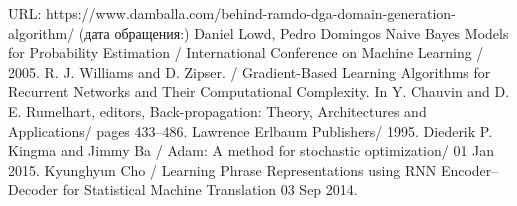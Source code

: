 \begin{thebibliography}{00}
    URL: https://www.damballa.com/behind-ramdo-dga-domain-generation-algorithm/
    (дата обращения:)
    Daniel Lowd, Pedro Domingos
    Naive Bayes Models for Probability Estimation /
    International Conference on Machine Learning /
    2005.
    R. J. Williams and D. Zipser. /
    Gradient-Based Learning Algorithms for Recurrent Networks and Their Computational Complexity. In Y. Chauvin and D. E. Rumelhart, editors, Back-propagation: Theory, Architectures and Applications/
    pages 433–486. Lawrence Erlbaum Publishers/
    1995.
    Diederik P. Kingma and Jimmy Ba /
    Adam: A method for stochastic optimization/
    01 Jan 2015.
    Kyunghyun Cho /
    Learning Phrase Representations using RNN Encoder–Decoder for Statistical Machine Translation
    03 Sep 2014.
\end{thebibliography}
\endgroup

\clearpage
